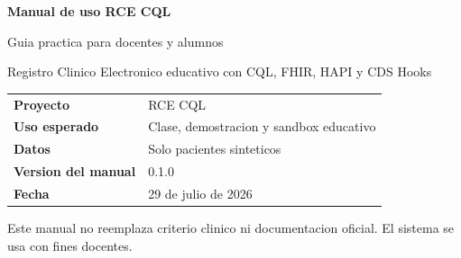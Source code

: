 \begin{titlepage}
  \centering
  \vspace*{2.5cm}
  {\Huge\bfseries Manual de uso RCE CQL\par}
  \vspace{0.6cm}
  {\Large Guia practica para docentes y alumnos\par}
  \vspace{1.4cm}
  {\large Registro Clinico Electronico educativo con CQL, FHIR, HAPI y CDS Hooks\par}
  \vfill
  \begin{tabular}{>{\bfseries}ll}
    Proyecto & RCE CQL \\
    Uso esperado & Clase, demostracion y sandbox educativo \\
    Datos & Solo pacientes sinteticos \\
    Version del manual & 0.1.0 \\
    Fecha & 29 de julio de 2026 \\
  \end{tabular}
  \vfill
  {\small Este manual no reemplaza criterio clinico ni documentacion oficial. El sistema se usa con fines docentes.}
\end{titlepage}
